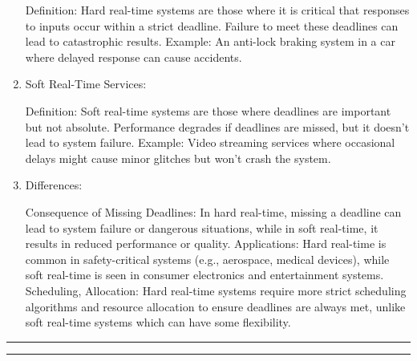 \documentclass[a4paper,11pt]{article}%
\newenvironment{qanda}{\setlength{\parindent}{0pt}}{\bigskip}
\begin{document}
\begin{qanda}
\begin{enumerate}[\hspace{1cm}1.]
		Definition: Hard real-time systems are those where it is critical that responses to inputs occur within a strict deadline. Failure to meet these deadlines can lead to catastrophic results.
		Example: An anti-lock braking system in a car where delayed response can cause accidents.
		\item Soft Real-Time Services:
	
		Definition: Soft real-time systems are those where deadlines are important but not absolute. Performance degrades if deadlines are missed, but it doesn't lead to system failure.
		Example: Video streaming services where occasional delays might cause minor glitches but won't crash the system.
		\item Differences:
	
		Consequence of Missing Deadlines: In hard real-time, missing a deadline can lead to system failure or dangerous situations, while in soft real-time, it results in reduced performance or quality.
		Applications: Hard real-time is common in safety-critical systems (e.g., aerospace, medical devices), while soft real-time is seen in consumer electronics and entertainment systems.
		Scheduling, Allocation: Hard real-time systems require more strict scheduling algorithms and resource allocation to ensure deadlines are always met, unlike soft real-time systems which can have some flexibility.
		
	\end{enumerate}
	

	

	
		
	
\end{qanda}



\vfill
\hrule
\vspace{0.5cm}



\vspace{1cm}
\hrule
\vspace{0.5cm}




\end{document}
